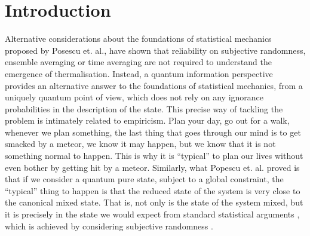 
\chapter*{Introduction}

Alternative considerations about the foundations of statistical mechanics proposed by Posescu et. al.\cite{popescu_foundations_2005},  have shown that reliability on subjective randomness\cite{ma_statistical_1985}, ensemble averaging\cite{farquhar_ergodic_1965} or time averaging\cite{jancel_foundations_2013} are not required to understand the emergence of thermalisation. Instead, a quantum information perspective\cite{horodecki_partial_2005} provides an alternative answer to the foundations of statistical mechanics, from a uniquely quantum point of view, which does not rely on any ignorance probabilities in the description of the state. This precise way of tackling the problem is intimately related to empiricism. 
Plan your day, go out for a walk, whenever we plan something, the last thing that goes through our mind is to get smacked by a meteor, we know it may happen, but we know that it is not something normal to happen. This is why it is  ``typical'' to plan our lives without even bother by getting hit by a meteor.
Similarly, what Popescu et. al. proved is that if we consider a quantum pure state, subject to a global constraint, the ``typical'' thing to happen is that the reduced state of the system is very close to the canonical mixed state. That is, not only is the state of the system mixed, but it is precisely in the state we would expect from standard statistical arguments \cite{popescu_foundations_2005}, which is achieved by considering  subjective randomness \cite{deutsch_thermodynamic_2010,singh_foundations_2013}. \\

